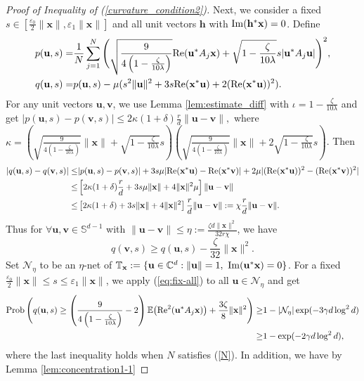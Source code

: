 \documentclass{article}
\renewcommand{\eqref}[1]{(\ref{#1})}
\newcommand{\C}{{\mathbb C}}
\newcommand{\E}{{\mathbb E}}
\newcommand{\bbS}{{\mathbb S}}
\newcommand{\calN}{{\mathcal N}}
\newcommand{\Prob}{{\rm Prob}}
\newcommand{\re}{{\rm Re}}
\newcommand{\im}{{\rm Im}}
\newcommand{\vx}{{\mathbf x}}
\newcommand{\vv}{{\mathbf v}}
\newcommand{\vu}{{\mathbf u}}
\newcommand{\vh}{{\mathbf h}}
\newcommand{\0}{{\mathbf 0}}
\numberwithin{equation}{section}
\begin{document}
\begin{proof}[Proof of Inequality of \eqref{curvature_condition2}]
	\noindent
	Next, we consider a fixed $s\in[\frac{\varepsilon_0}2\|\vx\|, \varepsilon_1\|\vx\|] $ and all unit vectors $\vh$ with $\im(\vh^*\vx)=0$. 
	Define 
	\begin{align*}
		p(\vu,s)=&\frac{1}{N}\sum_{j=1}^{N}\Bigg( \sqrt{\frac{9}{4\left(1-\frac{\zeta}{10\lambda}\right)}}\re(\vu^*A_j\vx)+\sqrt{1-\frac{\zeta}{10\lambda}}s|\vu^*A_j\vu|\Bigg)^2,\\ q(\vu,s)=&p(\vu,s)-\mu(s^2\|\vu\|^2+3s\re(\vx^*\vu)+2(\re(\vx^*\vu))^2).
	\end{align*} For any unit vectors $\vu,\vv$,  we use Lemma 
	\ref{lem:estimate_diff}  with $\iota=1-\frac{\zeta}{10\lambda}$ and get $
	|p(\vu,s)-p(\vv,s)|
	\le 2\kappa(1+\delta)\frac{r}{d}\|\vu-\vv\|,$
	where $\kappa=\left(\sqrt{\frac{9}{4\left(1-\frac{\zeta}{10\lambda}\right)}}\|\vx\|+\sqrt{1-\frac{\zeta}{10\lambda}}s\right)\left( \sqrt{\frac{9}{4\left(1-\frac{\zeta}{10\lambda}\right)}}\|\vx\|+2\sqrt{1-\frac{\zeta}{10\lambda}}s\right)$. Then
	\begin{align*}
		|q(\vu,s)-q(\vv,s)|
		\le& |p(\vu,s)-p(\vv,s)|+3s\mu|\re(\vx^*\vu)-\re(\vx^*\vv)|+2\mu|(\re(\vx^*\vu))^2-(\re(\vx^*\vv))^2|\\
		\le&
		\left[2\kappa(1+\delta)\frac{r}{d}+3s\mu\|\vx\|+4\|\vx\|^2\mu\right]\|\vu-\vv\|\\
		\le&
		\left[2\kappa(1+\delta)+3s\|\vx\|+4\|\vx\|^2\right]\frac{r}{d}\|\vu-\vv\|
		:=\chi\frac{r}{d}\|\vu-\vv\|.
	\end{align*}
	Thus for $\forall \vu,\vv\in\bbS^{d-1}$ with $ \|\vu-\vv\|\leq\eta:=\frac{\zeta d\|\vx\|^2}{32r\chi}$, we have
	\begin{equation}\label{covering_cond1_tilde}
		q(\vv,s)\ge q(\vu,s)-\frac{\zeta}{32}\|\vx\|^2.
	\end{equation}
	Set $\calN_\eta$ to be an $\eta$-net of $\mathbb T_\vx:=\{\vu\in\C^d:\|\vu\|=1,\ \im(\vu^*\vx)=0\}$. 
	For a fixed $\frac{\varepsilon_0}{2}\|\vx\|\le s\leq\varepsilon_1\|\vx\| $, we apply \eqref{eq:fix-all} to all $ \vu\in\calN_\eta $ and get 
	\begin{equation}\label{covering_cond2_tilde}
		\begin{split}
			\Prob\,\Bigg(q(\vu,s)\geq  \left(\frac{9}{4\left(1-\frac{\zeta}{10\lambda}\right)}-2\right)\E\big(\re^2(\vu^*A_j\vx)\big)+\frac{3\zeta}{8}\|\vx\|^2\Bigg)\ge& 1-|\calN_\eta|\exp(-3\gamma d\log^2d)\\
			\geq& 1-\exp(-2\gamma d\log^2d),
		\end{split}
	\end{equation}
	where the last inequality holds when $N$ satisfies \eqref{N}. In addition, we have by Lemma \ref{lem:concentration1-1}

\end{proof}
\end{document}
